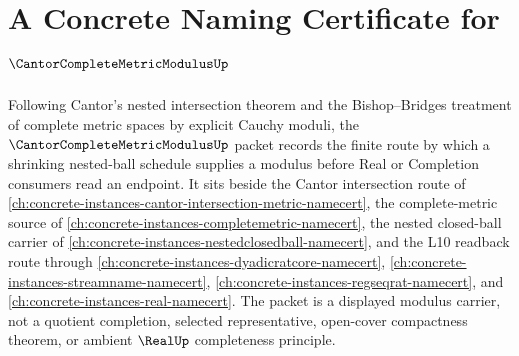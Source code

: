 \chapter{A Concrete Naming Certificate for $\CantorCompleteMetricModulusUp$}
\label{ch:concrete-instances-cantor-complete-metric-modulus-namecert}

Following Cantor's nested intersection theorem and the Bishop--Bridges treatment of complete metric spaces by explicit Cauchy moduli, the $\CantorCompleteMetricModulusUp$ packet records the finite route by which a shrinking nested-ball schedule supplies a modulus before Real or Completion consumers read an endpoint. It sits beside the Cantor intersection route of \autoref{ch:concrete-instances-cantor-intersection-metric-namecert}, the complete-metric source of \autoref{ch:concrete-instances-completemetric-namecert}, the nested closed-ball carrier of \autoref{ch:concrete-instances-nestedclosedball-namecert}, and the L10 readback route through \autoref{ch:concrete-instances-dyadicratcore-namecert}, \autoref{ch:concrete-instances-streamname-namecert}, \autoref{ch:concrete-instances-regseqrat-namecert}, and \autoref{ch:concrete-instances-real-namecert}. The packet is a displayed modulus carrier, not a quotient completion, selected representative, open-cover compactness theorem, or ambient $\RealUp$ completeness principle.

